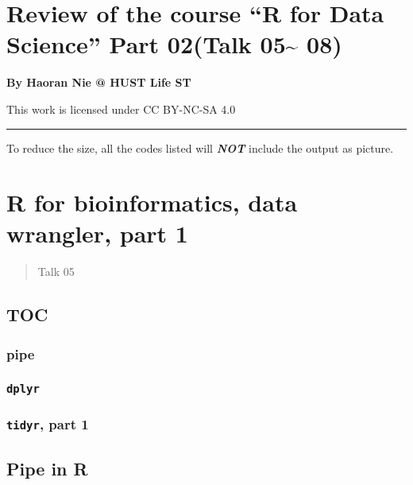 \documentclass[
]{article}
\author{}
\date{}
\begin{document}
\hypertarget{review-of-the-course-r-for-data-science-part-02talk-05-08}{%
\section{Review of the course ``R for Data Science'' Part 02(Talk
05\textasciitilde{}
08)}\label{review-of-the-course-r-for-data-science-part-02talk-05-08}}

\textbf{By Haoran Nie @ HUST Life ST}

This work is licensed under CC BY-NC-SA 4.0

\begin{center}\rule{0.5\linewidth}{0.5pt}\end{center}

To reduce the size, all the codes listed will \emph{\textbf{NOT}}
include the output as picture.

\hypertarget{r-for-bioinformatics-data-wrangler-part-1}{%
\section{R for bioinformatics, data wrangler, part
1}\label{r-for-bioinformatics-data-wrangler-part-1}}

\begin{quote}
Talk 05
\end{quote}

\hypertarget{toc}{%
\subsection{TOC}\label{toc}}

\hypertarget{pipe}{%
\subsubsection{pipe}\label{pipe}}

\hypertarget{dplyr}{%
\subsubsection{\texorpdfstring{\texttt{dplyr}}{dplyr}}\label{dplyr}}

\hypertarget{tidyr-part-1}{%
\subsubsection{\texorpdfstring{\texttt{tidyr}, part
1}{tidyr, part 1}}\label{tidyr-part-1}}

\hypertarget{pipe-in-r}{%
\subsection{Pipe in R}\label{pipe-in-r}}
\end{document}
